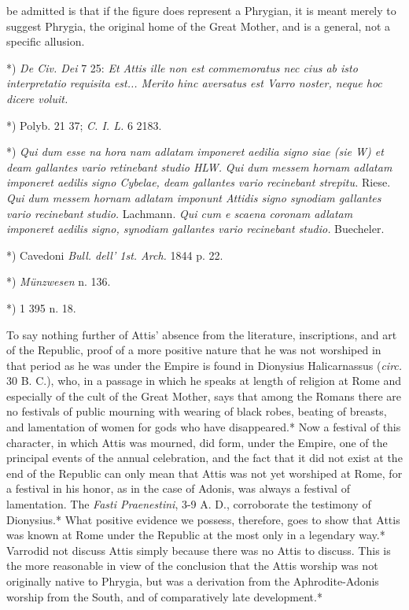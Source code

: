 \documentclass[a4paper, 11pt, oneside, polutonikogreek, english]{article}
\begin{document}
be admitted is that if the figure does represent a Phrygian, it is meant merely to suggest Phrygia, the original home of the Great Mother, and is a general, not a specific allusion.

*) \emph{De Civ. Dei} 7 25: \emph{Et Attis ille non est commemoratus nec cius ab isto interpretatio requisita est... Merito hinc aversatus est Varro noster, neque hoc dicere voluit.}

*) Polyb. 21 37; \emph{C. I. L.} 6 2183.

*) \emph{Qui dum esse na hora nam adlatam imponeret aedilia signo siae (sie W) et deam gallantes vario retinebant studio HLW.}  
\emph{Qui dum messem hornam adlatam imponeret aedilis signo Cybelae, deam gallantes vario recinebant strepitu.} Riese.  
\emph{Qui dum messem hornam adlatam imponunt Attidis signo synodiam gallantes vario recinebant studio.} Lachmann.  
\emph{Qui cum e scaena coronam adlatam imponeret aedilis signo, synodiam gallantes vario recinebant studio.} Buecheler.

*) Cavedoni \emph{Bull. dell' 1st. Arch.} 1844 p. 22.

*) \emph{Münzwesen} n. 136.

*) 1 395 n. 18.

To say nothing further of Attis' absence from the literature, inscriptions, and art of the Republic, proof of a more positive nature that he was not worshiped in that period as he was under the Empire is found in Dionysius Halicarnassus (\emph{circ.} 30 B. C.), who, in a passage in which he speaks at length of religion at Rome and especially of the cult of the Great Mother, says that among the Romans there are no festivals of public mourning with wearing of black robes, beating of breasts, and lamentation of women for gods who have disappeared.* Now a festival of this character, in which Attis was mourned, did form, under the Empire, one of the principal events of the annual celebration, and the fact that it did not exist at the end of the Republic can only mean that Attis was not yet worshiped at Rome, for a festival in his honor, as in the case of Adonis, was always a festival of lamentation. The \emph{Fasti Praenestini}, 3-9 A. D., corroborate the testimony of Dionysius.* What positive evidence we possess, therefore, goes to show that Attis was known at Rome under the Republic at the most only in a legendary way.* Varrodid not discuss Attis simply because there was no Attis to discuss. This is the more reasonable in view of the conclusion that the Attis worship was not originally native to Phrygia, but was a derivation from the Aphrodite-Adonis worship from the South, and of comparatively late development.*
\end{document}
